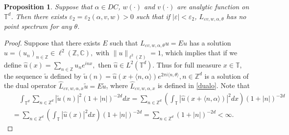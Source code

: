\documentclass[11pt]{amsart}
\newtheorem{proposition}[theorem]{Proposition}
\theoremstyle{remark}
\theoremstyle{definition}
\newcommand{\T}{{\mathbf T}}
\newcommand{\Z}{{\mathbf Z}}
\newcommand{\TT}{{\mathbb T}}
\def \Z{\mathcal{Z}}
\def\Z{{\mathbb Z}}
\def\T{{\mathbb T}}
\begin{document}
\begin{proposition}\label{np}
		Suppose that $\alpha\in DC$, $w(\cdot)$ and $v(\cdot)$ are analytic function on $\T^d$. Then
	there exists $\varepsilon_2=\varepsilon_2(\alpha,v,w)>0$ such that if $|\varepsilon|<\varepsilon_2$, $L_{\varepsilon v,w,\alpha,\theta}$   has no point spectrum for any $\theta$.
\end{proposition}
\begin{proof}
Suppose that there exists $E$ such that $L_{\varepsilon v,w,\alpha,\theta}u=Eu $ has a solution $u=(u_n)_{n\in\Z}\in\ell^2(\mathbb{Z},\mathbb{C}),$ with $\|u\|_{\ell^2(\mathbb{Z})}=1$, which implies that if we 
define  $\hat{u}(x)=\sum_{n\in\mathbb{Z}}u_ne^{inx},$ then $\hat{u}\in L^2(\TT^d)$.
Thus for full measure $x \in\TT $,  the sequence $\tilde{u}$ defined by
$
\tilde{u}(n)=\hat{u}(x+\langle n, \alpha\rangle) e^{2 \pi i \langle n, \theta\rangle},n\in\Z^d
$
is a solution of the dual operator $\widehat{L}_{\varepsilon v,w,\alpha,x}\tilde{u}=E \tilde{u}$, where  $\widehat{L}_{\varepsilon v,w,\alpha,x}$ is defined in \eqref{dualo}.
Note that
$$
\begin{aligned}
	&\quad\int_{\TT^d } \sum_{n \in \mathbb{Z}^d}|\tilde{u}(n)|^2(1+|n|)^{-2d} d x =\sum_{n \in \mathbb{Z}^d}(\int_{\TT }|\hat{u}(x+\langle n, \alpha\rangle)|^2 d x)(1+|n|)^{-2d } \\
	&=\sum_{n \in \mathbb{Z}^d}\left(\int_{\TT }|\hat{u}(x)|^2 d x \right)(1+|n|)^{-2d} 
	=\sum_{n \in \mathbb{Z}^d}(1+|n|)^{-2d} 
	<\infty.
\end{aligned}
$$


\end{proof}
\end{document}
